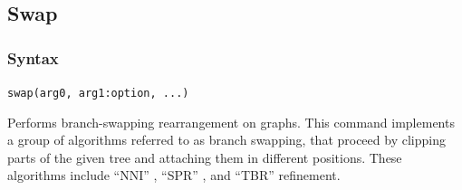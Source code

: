 \subsection{Swap} 
	\subsubsection{Syntax}
		\texttt{swap(arg0, arg1:option, ...)}
			
	\begin{phygdescription}
		{Performs branch-swapping rearrangement on graphs. This command implements a 
		group of algorithms referred to as branch swapping, that proceed by clipping
		parts of the given tree and attaching them in different positions. These algorithms 
		include ``NNI'' \citep{CaminandSokal1965, Robinson1971}, ``SPR'' \citep{Dayhoff1969}, 
		and ``TBR'' \citep{Farris1988, swofford1990a} refinement.}
	\end{phygdescription}
		
